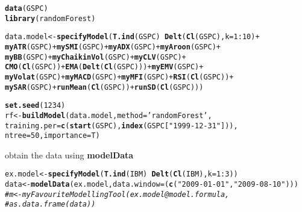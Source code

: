 \documentclass{article}\usepackage[]{graphicx}\usepackage[]{color}
\makeatletter
\newcommand{\hlnum}[1]{\textcolor[rgb]{0.686,0.059,0.569}{#1}}%
\newcommand{\hlstr}[1]{\textcolor[rgb]{0.192,0.494,0.8}{#1}}%
\newcommand{\hlcom}[1]{\textcolor[rgb]{0.678,0.584,0.686}{\textit{#1}}}%
\newcommand{\hlopt}[1]{\textcolor[rgb]{0,0,0}{#1}}%
\newcommand{\hlstd}[1]{\textcolor[rgb]{0.345,0.345,0.345}{#1}}%
\newcommand{\hlkwb}[1]{\textcolor[rgb]{0.69,0.353,0.396}{#1}}%
\newcommand{\hlkwc}[1]{\textcolor[rgb]{0.333,0.667,0.333}{#1}}%
\newcommand{\hlkwd}[1]{\textcolor[rgb]{0.737,0.353,0.396}{\textbf{#1}}}%
\newenvironment{kframe}{%
 \def\at@end@of@kframe{}%
 \ifinner\ifhmode%
  \def\at@end@of@kframe{\end{minipage}}%
  \begin{minipage}{\columnwidth}%
 \fi\fi%
 \def\FrameCommand##1{\hskip\@totalleftmargin \hskip-\fboxsep
 \colorbox{shadecolor}{##1}\hskip-\fboxsep
     \hskip-\linewidth \hskip-\@totalleftmargin \hskip\columnwidth}%
 \MakeFramed {\advance\hsize-\width
   \@totalleftmargin\z@ \linewidth\hsize
   \@setminipage}}%
 {\par\unskip\endMakeFramed%
 \at@end@of@kframe}
\newenvironment{knitrout}{}{} %
\makeatother
\begin{document}
\begin{knitrout}
\color{fgcolor}\begin{kframe}
\begin{alltt}
 \hlkwd{data}\hlstd{(GSPC)}
 \hlkwd{library}\hlstd{(randomForest)}
\end{alltt}


{\ttfamily\noindent\itshape\color{messagecolor}{\#\# randomForest 4.6-10\\\#\# Type rfNews() to see new features/changes/bug fixes.}}\begin{alltt}
 \hlstd{data.model} \hlkwb{<-} \hlkwd{specifyModel}\hlstd{(}\hlkwd{T.ind}\hlstd{(GSPC)} \hlopt{~} \hlkwd{Delt}\hlstd{(}\hlkwd{Cl}\hlstd{(GSPC),} \hlkwc{k}\hlstd{=}\hlnum{1}\hlopt{:}\hlnum{10}\hlstd{)} \hlopt{+}
 \hlkwd{myATR}\hlstd{(GSPC)} \hlopt{+} \hlkwd{mySMI}\hlstd{(GSPC)} \hlopt{+} \hlkwd{myADX}\hlstd{(GSPC)} \hlopt{+} \hlkwd{myAroon}\hlstd{(GSPC)} \hlopt{+}
 \hlkwd{myBB}\hlstd{(GSPC)} \hlopt{+} \hlkwd{myChaikinVol}\hlstd{(GSPC)} \hlopt{+} \hlkwd{myCLV}\hlstd{(GSPC)} \hlopt{+}
 \hlkwd{CMO}\hlstd{(}\hlkwd{Cl}\hlstd{(GSPC))} \hlopt{+} \hlkwd{EMA}\hlstd{(}\hlkwd{Delt}\hlstd{(}\hlkwd{Cl}\hlstd{(GSPC)))} \hlopt{+} \hlkwd{myEMV}\hlstd{(GSPC)} \hlopt{+}
 \hlkwd{myVolat}\hlstd{(GSPC)} \hlopt{+} \hlkwd{myMACD}\hlstd{(GSPC)} \hlopt{+} \hlkwd{myMFI}\hlstd{(GSPC)} \hlopt{+} \hlkwd{RSI}\hlstd{(}\hlkwd{Cl}\hlstd{(GSPC))} \hlopt{+}
 \hlkwd{mySAR}\hlstd{(GSPC)} \hlopt{+} \hlkwd{runMean}\hlstd{(}\hlkwd{Cl}\hlstd{(GSPC))} \hlopt{+} \hlkwd{runSD}\hlstd{(}\hlkwd{Cl}\hlstd{(GSPC)))}
\end{alltt}


{\ttfamily\noindent\color{warningcolor}{\#\# Warning: NaNs produced}}\begin{alltt}
 \hlkwd{set.seed}\hlstd{(}\hlnum{1234}\hlstd{)}
 \hlstd{rf} \hlkwb{<-} \hlkwd{buildModel}\hlstd{(data.model,}\hlkwc{method}\hlstd{=}\hlstr{'randomForest'}\hlstd{,}
 \hlkwc{training.per}\hlstd{=}\hlkwd{c}\hlstd{(}\hlkwd{start}\hlstd{(GSPC),}\hlkwd{index}\hlstd{(GSPC[}\hlstr{"1999-12-31"}\hlstd{])),}
 \hlkwc{ntree}\hlstd{=}\hlnum{50}\hlstd{,} \hlkwc{importance}\hlstd{=T)}
\end{alltt}
\end{kframe}
\end{knitrout}
obtain the data using \textbf{modelData}
\begin{knitrout}
\color{fgcolor}\begin{kframe}
\begin{alltt}
\hlstd{ex.model} \hlkwb{<-} \hlkwd{specifyModel}\hlstd{(}\hlkwd{T.ind}\hlstd{(IBM)} \hlopt{~} \hlkwd{Delt}\hlstd{(}\hlkwd{Cl}\hlstd{(IBM),} \hlkwc{k}\hlstd{=} \hlnum{1}\hlopt{:}\hlnum{3}\hlstd{))}
\hlstd{data} \hlkwb{<-} \hlkwd{modelData}\hlstd{(ex.model,} \hlkwc{data.window} \hlstd{= (}\hlkwd{c}\hlstd{(}\hlstr{"2009-01-01"}\hlstd{,} \hlstr{"2009-08-10"}\hlstd{)))}
\hlcom{#m <- myFavouriteModellingTool(ex.model@model.formula,}
\hlcom{#as.data.frame(data))}
\end{alltt}
\end{kframe}
\end{knitrout}
\end{document}
